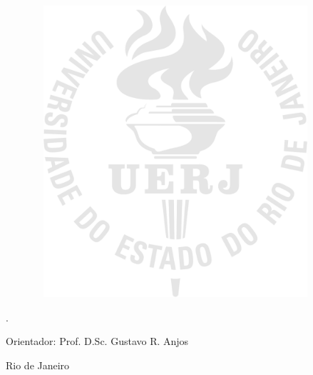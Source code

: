 \begin{center}

\authorName

\vspace{2cm}

\textbf{\mainTitle}

\vspace{1.0cm}

\begin{figure}[hbt!]
\begin{center}
\includegraphics[width=10.48cm,height=10.8cm]{./01_Pre_textuais/logo_uerj_gnd_pb.png}
\end{center}
\end{figure}

\vspace{-9cm}
\begin{flushright}
\parbox{8cm}{
.
}
\end{flushright}

\vspace{4.0cm}

Orientador: Prof. D.Sc. Gustavo R. Anjos\\

\par\vfill

Rio de Janeiro\\ \curYear

\end{center}